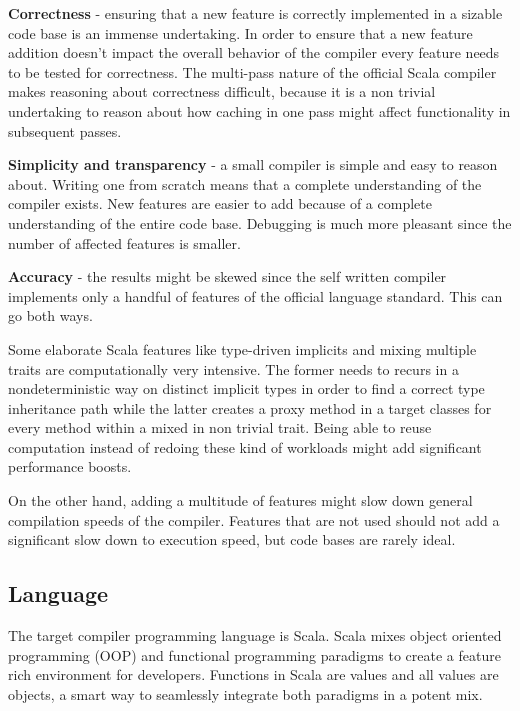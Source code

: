 \documentclass{VUMIFPSbakalaurinis}
\begin{document}
\textbf{Correctness} - ensuring that a new feature is correctly implemented in a sizable code base is an immense undertaking.
In order to ensure that a new feature addition doesn't impact the overall behavior of the compiler every feature needs to be tested for correctness.
The multi-pass nature of the official Scala compiler makes reasoning about correctness difficult, because it is a non trivial undertaking to reason about how caching in one pass might affect functionality in subsequent passes.

\textbf{Simplicity and transparency} - a small compiler is simple and easy to reason about.
Writing one from scratch means that a complete understanding of the compiler exists.
New features are easier to add because of a complete understanding of the entire code base.
Debugging is much more pleasant since the number of affected features is smaller.

\textbf{Accuracy} - the results might be skewed since the self written compiler implements only a handful of features of the official language standard.
This can go both ways.

Some elaborate Scala features like type-driven implicits and mixing multiple traits are computationally very intensive.
The former needs to recurs in a nondeterministic way on distinct implicit types in order to find a correct type inheritance path while the latter creates a proxy method in a target classes for every method within a mixed in non trivial trait.
Being able to reuse computation instead of redoing these kind of workloads might add significant performance boosts.

On the other hand, adding a multitude of features might slow down general compilation speeds of the compiler.
Features that are not used should not add a significant slow down to execution speed, but code bases are rarely ideal.

\subsection{Language}
The target compiler programming language is Scala.
Scala mixes object oriented programming (OOP)  and functional programming paradigms to create a feature rich environment for developers.
Functions in Scala are values and all values are objects, a smart way to seamlessly integrate both paradigms in a potent mix.
\end{document}
